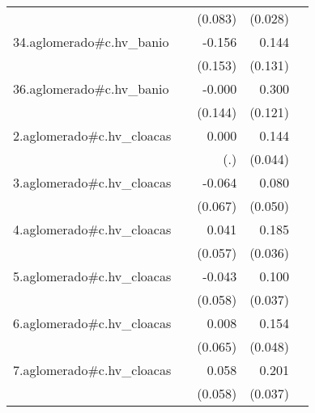 {\begin{longtable}{l*{4}{D{.}{.}{-1}}}
            &                     &     (0.083)         &     (0.028)         &                     \\
\addlinespace
34.aglomerado#c.hv\_banio&                     &      -0.156         &       0.144         &                     \\
            &                     &     (0.153)         &     (0.131)         &                     \\
\addlinespace
36.aglomerado#c.hv\_banio&                     &      -0.000         &       0.300\sym{*}  &                     \\
            &                     &     (0.144)         &     (0.121)         &                     \\
\addlinespace
2.aglomerado#c.hv\_cloacas&                     &       0.000         &       0.144\sym{**} &                     \\
            &                     &         (.)         &     (0.044)         &                     \\
\addlinespace
3.aglomerado#c.hv\_cloacas&                     &      -0.064         &       0.080         &                     \\
            &                     &     (0.067)         &     (0.050)         &                     \\
\addlinespace
4.aglomerado#c.hv\_cloacas&                     &       0.041         &       0.185\sym{***}&                     \\
            &                     &     (0.057)         &     (0.036)         &                     \\
\addlinespace
5.aglomerado#c.hv\_cloacas&                     &      -0.043         &       0.100\sym{**} &                     \\
            &                     &     (0.058)         &     (0.037)         &                     \\
\addlinespace
6.aglomerado#c.hv\_cloacas&                     &       0.008         &       0.154\sym{**} &                     \\
            &                     &     (0.065)         &     (0.048)         &                     \\
\addlinespace
7.aglomerado#c.hv\_cloacas&                     &       0.058         &       0.201\sym{***}&                     \\
            &                     &     (0.058)         &     (0.037)         &                     \\

\end{longtable}}
